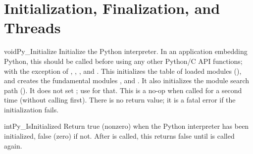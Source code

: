 \documentclass{manual}
\begin{document}
\chapter{Initialization, Finalization, and Threads
         \label{initialization}}

\begin{cfuncdesc}{void}{Py_Initialize}{}
Initialize the Python interpreter.  In an application embedding 
Python, this should be called before using any other Python/C API 
functions; with the exception of
,
,
,
and .
This initializes the table of loaded modules (), and
creates the
fundamental modules ,
 and
.  It also initializes the module
search path ().
It does not set ; use
 for that.  This
is a no-op when called for a second time (without calling
 first).  There is no
return value; it is a fatal error if the initialization fails.
\end{cfuncdesc}

\begin{cfuncdesc}{int}{Py_IsInitialized}{}
Return true (nonzero) when the Python interpreter has been
initialized, false (zero) if not.  After  is
called, this returns false until  is called
again.
\end{cfuncdesc}
\end{document}
